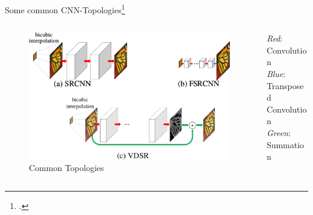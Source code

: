 \documentclass{beamer}
\begin{document}
\begin{frame}{Some common CNN-Topologies\footcite{LapSRN}}
\begin{columns}
\begin{column}{0.66\textwidth}
  \begin{figure}[h]
    \centering
    \includegraphics[width=1.0\textwidth]{sr_architectures}
    \caption*{Common Topologies}
    \label{fig:lap-srn}
  \end{figure}
\end{column}
\begin{column}{0.34\textwidth}
  \textit{Red}: Convolution\\
  \textit{Blue}: Transposed Convolution\\
  \textit{Green}: Summation
\end{column}
\end{columns}
\end{frame}
\end{document}
